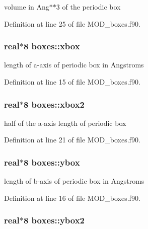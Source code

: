 volume in Ang$\ast$$\ast$3 of the periodic box 



Definition at line 25 of file M\-O\-D\-\_\-boxes.\-f90.

\hypertarget{classboxes_ae4dfe3914f47ce2bafd49eedbb1c740a}{
\subsubsection[{xbox}]{\setlength{\rightskip}{0pt plus 5cm}real$\ast$8 boxes\-::xbox}}\label{classboxes_ae4dfe3914f47ce2bafd49eedbb1c740a}


length of a-\/axis of periodic box in Angstroms 



Definition at line 15 of file M\-O\-D\-\_\-boxes.\-f90.

\hypertarget{classboxes_a41afebf3094fba2eaec4f035140fc3ac}{
\subsubsection[{xbox2}]{\setlength{\rightskip}{0pt plus 5cm}real$\ast$8 boxes\-::xbox2}}\label{classboxes_a41afebf3094fba2eaec4f035140fc3ac}


half of the a-\/axis length of periodic box 



Definition at line 21 of file M\-O\-D\-\_\-boxes.\-f90.

\hypertarget{classboxes_afe5321269ac54818115405d3424f39ab}{
\subsubsection[{ybox}]{\setlength{\rightskip}{0pt plus 5cm}real$\ast$8 boxes\-::ybox}}\label{classboxes_afe5321269ac54818115405d3424f39ab}


length of b-\/axis of periodic box in Angstroms 



Definition at line 16 of file M\-O\-D\-\_\-boxes.\-f90.

\hypertarget{classboxes_a88205d54fca966a21525295d45d0bf87}{
\subsubsection[{ybox2}]{\setlength{\rightskip}{0pt plus 5cm}real$\ast$8 boxes\-::ybox2}}\label{classboxes_a88205d54fca966a21525295d45d0bf87}


